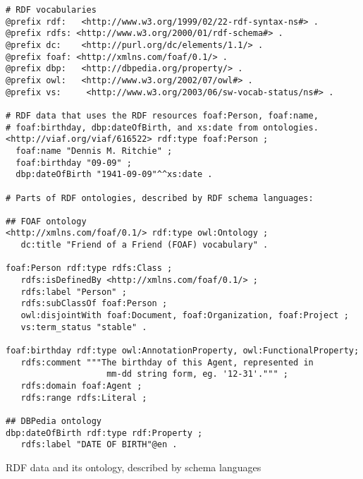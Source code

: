 \begin{example}[htp]
\centering
\begin{lstlisting}[language=turtle]
# RDF vocabularies
@prefix rdf:   <http://www.w3.org/1999/02/22-rdf-syntax-ns#> .
@prefix rdfs: <http://www.w3.org/2000/01/rdf-schema#> .
@prefix dc:    <http://purl.org/dc/elements/1.1/> .
@prefix foaf: <http://xmlns.com/foaf/0.1/> .
@prefix dbp:   <http://dbpedia.org/property/> .
@prefix owl:   <http://www.w3.org/2002/07/owl#> .
@prefix vs:     <http://www.w3.org/2003/06/sw-vocab-status/ns#> .

# RDF data that uses the RDF resources foaf:Person, foaf:name,
# foaf:birthday, dbp:dateOfBirth, and xs:date from ontologies.
<http://viaf.org/viaf/616522> rdf:type foaf:Person ;
  foaf:name "Dennis M. Ritchie" ;
  foaf:birthday "09-09" ;
  dbp:dateOfBirth "1941-09-09"^^xs:date .

# Parts of RDF ontologies, described by RDF schema languages:

## FOAF ontology
<http://xmlns.com/foaf/0.1/> rdf:type owl:Ontology ;
   dc:title "Friend of a Friend (FOAF) vocabulary" .

foaf:Person rdf:type rdfs:Class ;
   rdfs:isDefinedBy <http://xmlns.com/foaf/0.1/> ;
   rdfs:label "Person" ;
   rdfs:subClassOf foaf:Person ;
   owl:disjointWith foaf:Document, foaf:Organization, foaf:Project ;
   vs:term_status "stable" .

foaf:birthday rdf:type owl:AnnotationProperty, owl:FunctionalProperty;
   rdfs:comment """The birthday of this Agent, represented in
                    mm-dd string form, eg. '12-31'.""" ;
   rdfs:domain foaf:Agent ;
   rdfs:range rdfs:Literal ;

## DBPedia ontology
dbp:dateOfBirth rdf:type rdf:Property ;
   rdfs:label "DATE OF BIRTH"@en .
\end{lstlisting}
\caption{RDF data and its ontology, described by  schema languages}
\label{ex:rdfodata}
\end{example}

